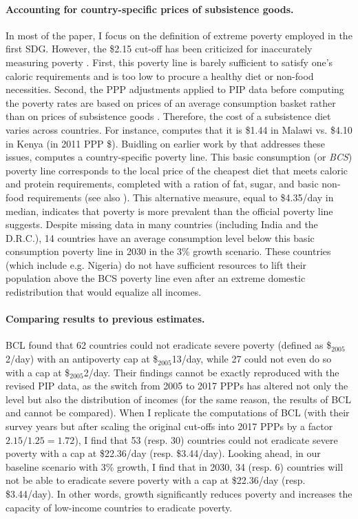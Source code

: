\documentclass[12pt,english]{article}
\begin{document}
\paragraph{Accounting for country-specific prices of subsistence goods.}
In most of the paper, I focus on the definition of extreme poverty employed in the first SDG. However, the \$2.15 cut-off has been criticized for inaccurately measuring poverty \citep{woodward_redefining_2010,deaton_price_2010,deaton_purchasing_2011}. %
First, this poverty line %
is barely sufficient to satisfy one's caloric requirements and is too low to procure a healthy diet or non-food necessities. 
Second, the PPP adjustments applied to PIP data before computing the poverty rates are based on prices of an average consumption basket rather than on prices of subsistence goods \citep{sullivan_capitalist_2023}. Therefore, the cost of a subsistence diet varies across countries. For instance, \cite{moatsos_global_2016} computes that it is \$1.44 in Malawi vs. \$4.10 in Kenya (in 2011 PPP \$). Buidling on earlier work by \cite{allen_absolute_2017} that addresses these issues, \cite{moatsos_global_2016} computes a country-specific poverty line. This basic consumption (or \textit{BCS}) poverty line corresponds to the local price of the cheapest diet that meets caloric and protein requirements, completed with a ration of fat, sugar, and basic non-food requirements (see also \citealp{moatsos_global_2021}). This alternative measure, equal to \$4.35/day in median, indicates that poverty %
is more prevalent than the official poverty line suggests. Despite missing data in many countries (including India and the D.R.C.), 14 countries have an average consumption level below this basic consumption poverty line in 2030 in the 3\% growth scenario. These countries (which include e.g. Nigeria) do not have sufficient resources to lift their population above the BCS poverty line even after an extreme domestic redistribution that would equalize all incomes. 

\paragraph{Comparing results to previous estimates.}
BCL found that 62 countries could not eradicate severe poverty (defined as \$$_\text{2005}$2/day) with an antipoverty cap at \$$_\text{2005}$13/day, while 27 could not even do so with a cap at \$$_\text{2005}$2/day. 
Their findings cannot be exactly reproduced with the revised PIP data, as the switch from 2005 to 2017 PPPs has altered not only the level but also the distribution of incomes (for the same reason, the results of BCL and \cite{ravallion_poorer_2010} cannot be compared). 
When I replicate the computations of BCL (with their survey years but after scaling the original cut-offs into 2017 PPPs by a factor $2.15/1.25 = 1.72$), I find that 53 (resp. 30) 
countries could not eradicate severe poverty with a cap at \$22.36/day (resp. \$3.44/day). 
Looking ahead, in our baseline scenario with 3\% growth, I find that in 2030, 34 (resp. 6) 
countries will not be able to eradicate severe poverty with a cap at \$22.36/day (resp. \$3.44/day). In other words, growth significantly reduces poverty and increases the capacity of low-income countries to eradicate poverty.
\end{document}
